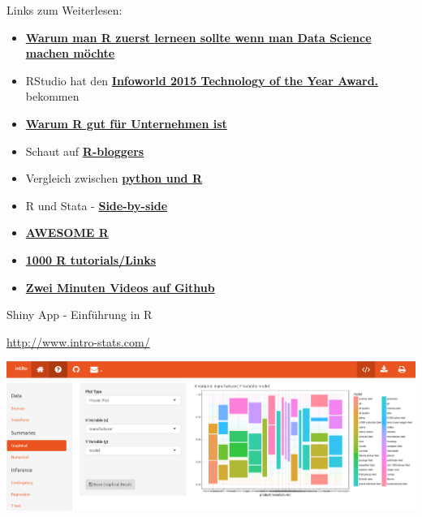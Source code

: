 \documentclass[ignorenonframetext,]{beamer}
\begin{document}
\begin{frame}{Links zum Weiterlesen:}
\protect\hypertarget{links-zum-weiterlesen}{}

\begin{itemize}
\item
  \href{http://www.r-bloggers.com/why-you-should-learn-r-first-for-data-science/}{\textbf{Warum
  man R zuerst lerneen sollte wenn man Data Science machen möchte}}
\item
  RStudio hat den
  \href{http://www.r-bloggers.com/rstudio-infoworld-2015-technology-of-the-year-award-recipient/}{\textbf{Infoworld
  2015 Technology of the Year Award.}} bekommen
\item
  \href{http://www.fastcolabs.com/3030063/why\%20the\%20r\%20programming\%20language\%20is\%20good\%20for\%20business}{\textbf{Warum
  R gut für Unternehmen ist}}
\item
  Schaut auf
  \href{http://www.r-bloggers.com/why-use-r/}{\textbf{R-bloggers}} 
\item
  Vergleich zwischen
  \href{http://www.dataschool.io/python-or-r-for-data-science/}{\textbf{python
  und R}}
\item
  R und Stata -
  \href{http://economistry.com/2013/11/r-impact-evaluation-r-stata-side-side/}{\textbf{Side-by-side}}
\item
  \href{https://awesome-r.com/}{\textbf{AWESOME R}}
\item
  \href{https://support.bioconductor.org/p/33781/}{\textbf{1000 R
  tutorials/Links}}
\item
  \href{https://www.youtube.com/playlist?list=PLcgz5kNZFCkzSyBG3H-rUaPHoBXgijHfC}{\textbf{Zwei
  Minuten Videos auf Github}}
\end{itemize}

\end{frame}

\begin{frame}{Shiny App - Einführung in R}
\protect\hypertarget{shiny-app---einfuhrung-in-r}{}

\url{http://www.intro-stats.com/}

\includegraphics{figure/intror_shiny.PNG}

\end{frame}
\end{document}
